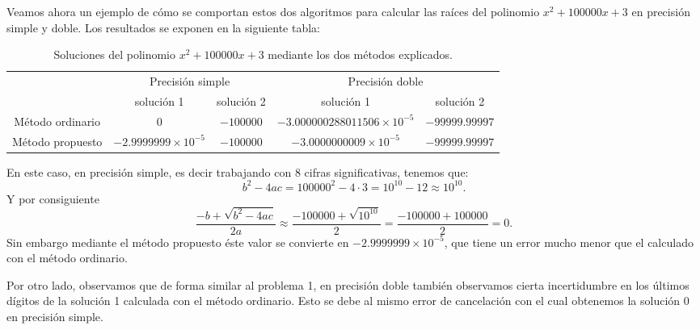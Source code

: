 \documentclass[a4paper]{article}
\begin{document}
Veamos ahora un ejemplo de cómo se comportan estos dos algoritmos para calcular las raíces del polinomio $x^2+100000x+3$ en precisión simple y doble. Los resultados se exponen en la siguiente tabla:\par
\begin{table}[ht]
	\centering
	\begin{tabular}{|c|c|c||c|c|}
	    \hline
	    & \multicolumn{2}{c||}{Precisión simple} & \multicolumn{2}{c|}{Precisión doble}\\
		\cline{2-5} 
		& solución 1 & solución 2 & solución 1 & solución 2\\
		\hline
		Método ordinario & $0$ & $-100000$ & $-3.000000288011506\times10^{-5}$ & $-99999.99997$ \\
		\hline
		Método propuesto &  $-2.9999999\times10^{-5}$ & $-100000$ & $-3.0000000009\times10^{-5}$ & $-99999.99997$\\
		\hline
	\end{tabular}
		\caption{Soluciones del polinomio $x^2+100000x+3$ mediante los dos métodos explicados.}
		\label{tab:10}
	\end{table}
En este caso, en precisión simple, es decir trabajando con 8 cifras significativas, tenemos que: $$b^2-4ac=100000^2-4\cdot 3=10^{10}-12\approx10^{10}.$$
Y por consiguiente $$\frac{-b+\sqrt{b^2-4ac}}{2a}\approx\frac{-100000+\sqrt{10^{10}}}{2}=\frac{-100000+100000}{2}=0.$$ Sin embargo mediante el método propuesto éste valor se convierte en $-2.9999999\times 10^{-5}$, que tiene un error mucho menor que el calculado con el método ordinario.\par Por otro lado, observamos que de forma similar al problema 1, en precisión doble también observamos cierta incertidumbre en los últimos dígitos de la solución 1 calculada con el método ordinario. Esto se debe al mismo error de cancelación con el cual obtenemos la solución 0 en precisión simple.
\newpage
\end{document}
